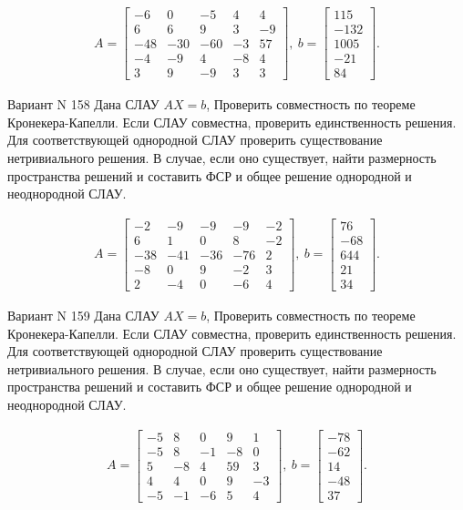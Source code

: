 \documentclass[11pt]{report}
\begin{document}
\begin{align*}
 A = \left[\begin{matrix}-6 & 0 & -5 & 4 & 4\\6 & 6 & 9 & 3 & -9\\-48 & -30 & -60 & -3 & 57\\-4 & -9 & 4 & -8 & 4\\3 & 9 & -9 & 3 & 3\end{matrix}\right],
\ b = \left[\begin{matrix}115\\-132\\1005\\-21\\84\end{matrix}\right]. 
 \end{align*}

Вариант N 158
Дана СЛАУ $AX = b$,
Проверить совместность по теореме Кронекера-Капелли. Если СЛАУ совместна, проверить единственность решения.
Для соответствующей однородной СЛАУ проверить существование нетривиального решения. В случае, если оно существует,
найти размерность пространства решений и составить ФСР и общее решение однородной  и неоднородной СЛАУ.


\begin{align*}
 A = \left[\begin{matrix}-2 & -9 & -9 & -9 & -2\\6 & 1 & 0 & 8 & -2\\-38 & -41 & -36 & -76 & 2\\-8 & 0 & 9 & -2 & 3\\2 & -4 & 0 & -6 & 4\end{matrix}\right],
\ b = \left[\begin{matrix}76\\-68\\644\\21\\34\end{matrix}\right]. 
 \end{align*}

Вариант N 159
Дана СЛАУ $AX = b$,
Проверить совместность по теореме Кронекера-Капелли. Если СЛАУ совместна, проверить единственность решения.
Для соответствующей однородной СЛАУ проверить существование нетривиального решения. В случае, если оно существует,
найти размерность пространства решений и составить ФСР и общее решение однородной  и неоднородной СЛАУ.


\begin{align*}
 A = \left[\begin{matrix}-5 & 8 & 0 & 9 & 1\\-5 & 8 & -1 & -8 & 0\\5 & -8 & 4 & 59 & 3\\4 & 4 & 0 & 9 & -3\\-5 & -1 & -6 & 5 & 4\end{matrix}\right],
\ b = \left[\begin{matrix}-78\\-62\\14\\-48\\37\end{matrix}\right]. 
 \end{align*}
\end{document}
